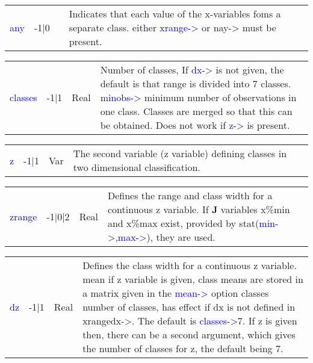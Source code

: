 \vspace{-1.51em}
\begin{table}[H]
\begin{tabular}{ m{}  m{}m{}p{}}
\textcolor{blue}{any}&-1|0& &Indicates that each value of the x-variables foms a separate class.
  either \textcolor{blue}{xrange->} or nay-> must be present.
\\ \cline{1-4}
\end{tabular}
\end{table}
\vspace{-1.51em}
\begin{table}[H]
\begin{tabular}{ m{}  m{}m{}p{}}
 \textcolor{blue}{classes}&-1|1&Real& Number of classes, If \textcolor{blue}{dx}-> is not given, the default is that range is
 divided into 7 classes.
 \textcolor{blue}{minobs->} minimum number of observations in one class. Classes are merged so that this can
 be obtained. Does not work if \textcolor{blue}{z->} is present.

\\ \cline{1-4}
\end{tabular}
\end{table}
\vspace{-1.51em}
\begin{table}[H]
\begin{tabular}{ m{}  m{}m{}p{}}
 \textcolor{blue}{z}&-1|1&Var& The second variable (z variable) defining classes in two dimensional classification.
\\ \cline{1-4}
\end{tabular}
\end{table}
\vspace{-1.51em}
\begin{table}[H]
\begin{tabular}{ m{}  m{}m{}p{}}
 \textcolor{blue}{zrange} &-1|0|2&Real& Defines the range and class width for a continuous z
 variable. If \textbf{J} variables x\%min and x\%max exist,
  provided by \textcolor{VioletRed}{stat}(\textcolor{blue}{min->},\textcolor{blue}{max->}), they are used.
\\ \cline{1-4}
\end{tabular}
\end{table}
\vspace{-1.51em}
\begin{table}[H]
\begin{tabular}{ m{}  m{}m{}p{}}
 \textcolor{blue}{dz} &-1|1&Real& Defines the class width for a continuous z variable.
 mean if z variable is given, class means are stored in a matrix given in the \textcolor{blue}{mean->}
 option
 classes number of classes, has effect if dx is not defined in xrangedx->. The default is
 \textcolor{blue}{classes->}7. If z is given then, there can be a second argument, which gives the
 number of classes for z, the default being 7.
\\ \cline{1-4}
\end{tabular}
\end{table}
